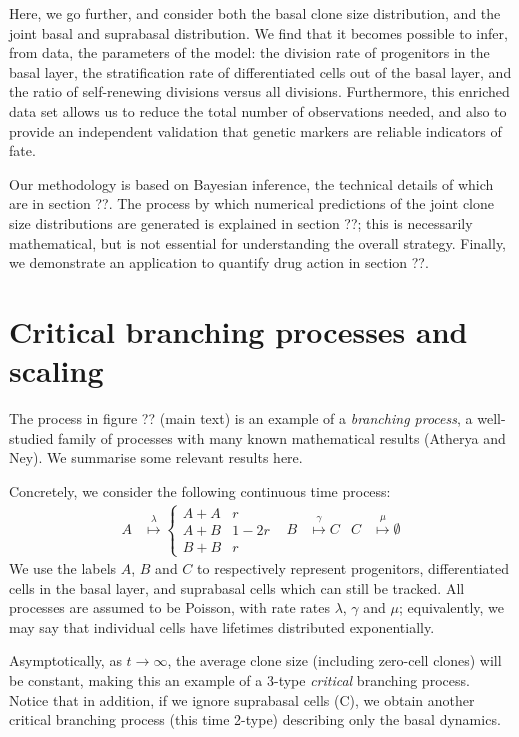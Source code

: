 \documentclass[10pt,UKenglish]{article}
\begin{document}
Here, we go further, and consider both the basal clone size distribution, and
the joint basal and suprabasal distribution. We find that it becomes possible to
infer, from data, the parameters of the model: the division rate of progenitors
in the basal layer, the stratification rate of differentiated cells out of the
basal layer, and the ratio of self-renewing divisions versus all divisions.
Furthermore, this enriched data set allows us to reduce the total number of
observations needed, and also to provide an independent validation that genetic
markers are reliable indicators of fate. 

Our methodology is based on Bayesian inference, the technical details of which
are in section ??. The process by which numerical predictions of the joint clone
size distributions are generated is explained in section ??; this is necessarily
mathematical, but is not essential for understanding the overall strategy.
Finally, we demonstrate an application to quantify drug action in section ??.

\section{Critical branching processes and scaling}

The process in figure ?? (main text) is an example of a \emph{branching
process}, a well-studied family of processes with many known mathematical
results (Atherya and Ney). We summarise some relevant results here.

Concretely, we consider the following continuous time process:
\begin{align*}
A &\overset{\lambda}{\longmapsto} \begin{cases}
A+A & r \\
A+B & 1-2r \\
B+B & r\end{cases} & B &\overset{\gamma}{\longmapsto} C & C &\overset{\mu}{\longmapsto} \emptyset
\end{align*}
We use the labels $A$, $B$ and $C$ to respectively represent progenitors,
differentiated cells in the basal layer, and suprabasal cells which can still be
tracked. All processes are assumed to be Poisson, with rate rates $\lambda$, $\gamma$ and $\mu$; equivalently, we may say that individual cells have lifetimes distributed exponentially.

Asymptotically, as $t \rightarrow \infty$, the average clone size (including
zero-cell clones) will be constant, making this an example of a 3-type
\emph{critical} branching process. Notice that in addition, if we ignore
suprabasal cells (C), we obtain another critical branching process (this time
2-type) describing only the basal dynamics.
\end{document}

